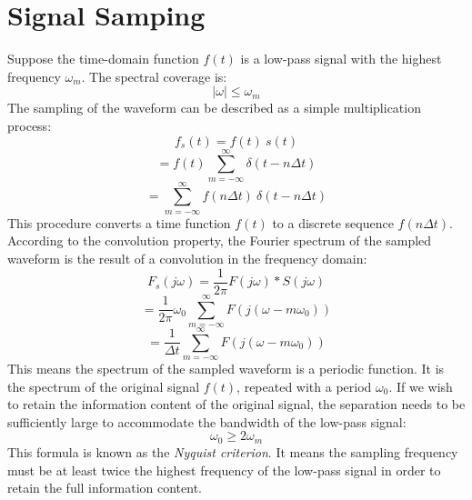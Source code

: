 \documentclass{article}
\begin{document}
\section{Signal Samping}
Suppose the time-domain function \(f(t)\) is a low-pass signal with the highest frequency \(\omega_m\). The spectral coverage is:
\[
|\omega| \leq \omega_m
\]
The sampling of the waveform can be described as a simple multiplication process:
\[
f_s(t) = f(t) \ s(t)
\]
\[
= f(t) \sum_{m=-\infty}^{\infty} \delta(t-n\Delta t)
\]
\[
= \sum_{m=-\infty}^{\infty} f(n\Delta t) \ \delta(t-n\Delta t)
\]
This procedure converts a time function \(f(t)\) to a discrete sequence \(f(n\Delta t)\). According to the convolution property, the Fourier spectrum of the sampled waveform is the result of a
convolution in the frequency domain:
\[
F_s(j\omega) = \frac{1}{2\pi}F(j\omega)*S(j\omega)
\]
\[
= \frac{1}{2\pi}\omega_0 \sum_{m=-\infty}^{\infty}F(j(\omega-m\omega_0))
\]
\[
= \frac{1}{\Delta t} \sum_{m=-\infty}^{\infty}F(j(\omega-m\omega_0))
\]
This means the spectrum of the sampled waveform is a periodic function. It is the spectrum
of the original signal \(f(t)\), repeated with a period \(\omega_0\). If we wish to retain the information content of the original signal, the separation needs to be sufficiently large to accommodate the bandwidth of the low-pass signal:
\[
\omega_0 \geq 2\omega_m
\]
This formula is known as the \textit{Nyquist criterion}. It means the sampling frequency must be at least twice the highest frequency of the low-pass signal in order to retain the full information content.
\end{document}
